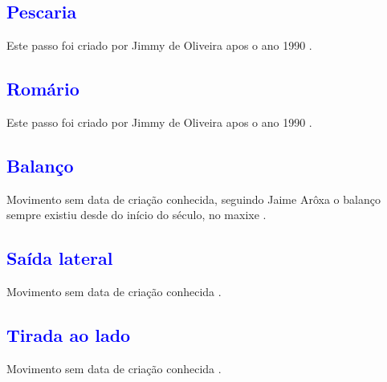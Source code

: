 \subsection{\textcolor{blue}{Pescaria}} 
Este passo foi criado por Jimmy de Oliveira apos o ano 1990 \cite{sambafunkeadoJimmyDeOliveiraPart1}.

\subsection{\textcolor{blue}{Romário}}
\label{subsec:passo:romario}
Este passo foi criado por Jimmy de Oliveira apos o ano 1990 \cite{sambafunkeadoJimmyDeOliveiraPart1}.





\subsection{\textcolor{blue}{Balanço}}
Movimento sem data de criação conhecida, 
seguindo Jaime Arôxa o balanço sempre existiu desde do início do século, 
no maxixe \cite{EntrevistaJaimeAroxa1} \cite[pp. 144]{perna2002samba}.


\subsection{\textcolor{blue}{Saída lateral}}
Movimento sem data de criação conhecida \cite[pp. 144]{perna2002samba}.

\subsection{\textcolor{blue}{Tirada ao lado}}
Movimento sem data de criação conhecida \cite[pp. 144]{perna2002samba}.

